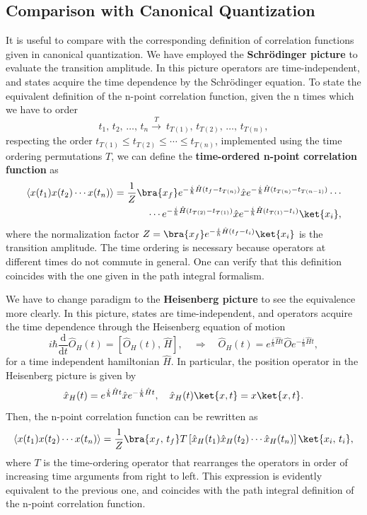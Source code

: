 \subsection{Comparison with Canonical Quantization}

It is useful to compare with the corresponding definition of correlation functions given in canonical quantization. We have employed the \textbf{Schrödinger picture} to evaluate the transition amplitude. In this picture operators are time-independent, and states acquire the time dependence by the Schrödinger equation. To state the equivalent definition of the n-point correlation function, given the n times which we have to order
\[
    t_1,\,t_2,\, \dots,\, t_n \xrightarrow{T} \ t_{T(1)} ,\, t_{T(2)} ,\, \dots,\, t_{T(n)},
\]
respecting the order \(t_{T(1)} \leq t_{T(2)} \leq \cdots \leq t_{T(n)}\), implemented using the time ordering permutations \(T\), we can define the \textbf{time-ordered n-point correlation function} as
\[
    \begin{aligned}
        \langle x(t_1)x(t_2)\cdots x(t_n) \rangle = \frac{1}{Z} \bra{x_f} e^{-\frac{i}{\hbar}\hat{H}(t_f - t_{T(n)})} \hat{x} e^{-\frac{i}{\hbar}\hat{H}(t_{T(n)} - t_{T(n-1)})} \cdots \\
        \cdots e^{-\frac{i}{\hbar}\hat{H}(t_{T(2)} - t_{T(1)})} \hat{x} e^{-\frac{i}{\hbar}\hat{H}(t_{T(1)} - t_i)} \ket{x_i},
    \end{aligned}
\]
where the normalization factor \(Z = \bra{x_f} e^{-\frac{i}{\hbar}\hat{H}(t_f - t_i)} \ket{x_i}\) is the transition amplitude. The time ordering is necessary because operators at different times do not commute in general. One can verify that this definition coincides with the one given in the path integral formalism.

We have to change paradigm to the \textbf{Heisenberg picture} to see the equivalence more clearly. In this picture, states are time-independent, and operators acquire the time dependence through the Heisenberg equation of motion
\[
    i \hbar \frac{\mathrm{d}}{\mathrm{d} t} \hat{O}_H (t) = [\hat{O}_H (t),\, \hat{H}], \quad \Longrightarrow \quad \hat{O}_H (t) = e^{\frac{i}{\hbar}\hat{H} t} \hat{O} e^{-\frac{i}{\hbar}\hat{H} t},
\]
for a time independent hamiltonian \(\hat{H}\). In particular, the position operator in the Heisenberg picture is given by
\[
    \hat{x}_H (t) = e^{\frac{i}{\hbar}\hat{H} t} \hat{x} e^{-\frac{i}{\hbar}\hat{H} t}, \quad \hat{x}_H(t) \ket{x, t} = x \ket{x, t}.
\]
Then, the n-point correlation function can be rewritten as
\[
    \langle x(t_1)x(t_2)\cdots x(t_n) \rangle = \frac{1}{Z} \bra{x_f,\,t_f} T \left[ \hat{x}_H (t_1) \hat{x}_H (t_2) \cdots \hat{x}_H (t_n) \right] \ket{x_i,\,t_i},
\]
where \(T\) is the time-ordering operator that rearranges the operators in order of increasing time arguments from right to left. This expression is evidently equivalent to the previous one, and coincides with the path integral definition of the n-point correlation function.

